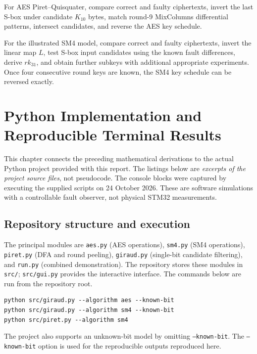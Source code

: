 \documentclass[11pt,a4paper]{report}
\begin{document}
For AES Piret--Quisquater, compare correct and faulty ciphertexts, invert the last S-box under candidate \(K_{10}\) bytes, match round-9 MixColumns differential patterns, intersect candidates, and reverse the AES key schedule.

For the illustrated SM4 model, compare correct and faulty ciphertexts, invert the linear map \(L\), test S-box input candidates using the known fault differences, derive \(rk_{31}\), and obtain further subkeys with additional appropriate experiments. Once four consecutive round keys are known, the SM4 key schedule can be reversed exactly.


\chapter{Python Implementation and Reproducible Terminal Results}
\label{chap:implementation}
This chapter connects the preceding mathematical derivations to the actual Python project provided with this report. The listings below are \emph{excerpts of the project source files}, not pseudocode. The console blocks were captured by executing the supplied scripts on 24 October 2026. These are software simulations with a controllable fault observer, not physical STM32 measurements.

\section{Repository structure and execution}
The principal modules are \texttt{aes.py} (AES operations), \texttt{sm4.py} (SM4 operations), \texttt{piret.py} (DFA and round peeling), \texttt{giraud.py} (single-bit candidate filtering), and \texttt{run.py} (combined demonstration). The repository stores these modules in \texttt{src/}; \texttt{src/gui.py} provides the interactive interface. The commands below are run from the repository root.
\begin{lstlisting}[style=terminal]
python src/giraud.py --algorithm aes --known-bit
python src/giraud.py --algorithm sm4 --known-bit
python src/piret.py --algorithm sm4
\end{lstlisting}
The project also supports an unknown-bit model by omitting \texttt{--known-bit}. The \texttt{--known-bit} option is used for the reproducible outputs reproduced here.
\end{document}

